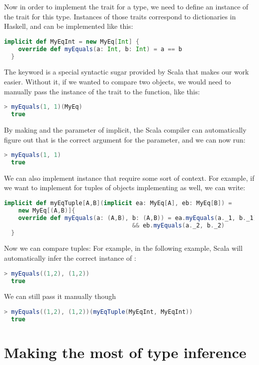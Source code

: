 Now in order to implement the trait for a type, we need to define an instance
of the trait for this type. Instances of those traits correspond to dictionaries
in Haskell, and can be implemented like this:
\begin{lstlisting}[language=Scala,gobble=2]
  implicit def MyEqInt = new MyEq[Int] {
    override def myEquals(a: Int, b: Int) = a == b
  }
\end{lstlisting}
The  keyword is a special syntactic sugar provided by Scala
that makes our work easier. Without it, if we wanted to compare two objects,
we would need to manually pass the instance of the trait to the function,
like this:
\begin{lstlisting}[language=Scala,gobble=2]
  > myEquals(1, 1)(MyEq)
  true
\end{lstlisting}
By making  and the  parameter of  implicit,
the Scala compiler can automatically figure out that  is the
correct argument for the  parameter, and we can now run:
\begin{lstlisting}[language=Scala,gobble=2]
  > myEquals(1, 1)
  true
\end{lstlisting}


We can also implement instance that require some sort of context. For
example, if we want to implement  for tuples of objects implementing
 as well, we can write:
\begin{lstlisting}[language=Scala,gobble=2]
  implicit def myEqTuple[A,B](implicit ea: MyEq[A], eb: MyEq[B]) =
    new MyEq[(A,B)]{
    override def myEquals(a: (A,B), b: (A,B)) = ea.myEquals(a._1, b._1)
                                    && eb.myEquals(a._2, b._2)
  }
\end{lstlisting}
Now we can compare tuples: For example, in the following example, Scala will
automatically infer the correct instance of :
\begin{lstlisting}[language=Scala,gobble=2]
  > myEquals((1,2), (1,2))
  true
\end{lstlisting}
We can still pass  it manually though
\begin{lstlisting}[language=Scala,gobble=2]
  > myEquals((1,2), (1,2))(myEqTuple(MyEqInt, MyEqInt))
  true
\end{lstlisting}

\section{Making the most of type inference}
\label{type-inference}

